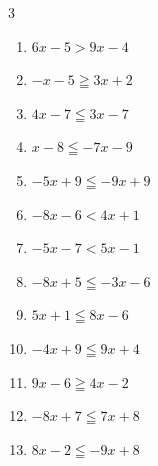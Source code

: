 \begin{multicols}{3}
\begin{enumerate}
  \item $6x-5>9x-4$


  \item $-x-5\geqq 3x+2$


  \item $4x-7\leqq 3x-7$

        \phantom{$\displaystyle x\leqq 0$}

  \item $x-8\leqq -7x-9$


  \item $-5x+9\leqq -9x+9$

        \phantom{$\displaystyle x\leqq 0$}

  \item $-8x-6<4x+1$


  \item $-5x-7<5x-1$


  \item $-8x+5\leqq -3x-6$


\columnbreak %

\resetques

  \item $5x+1\leqq 8x-6$


  \item $-4x+9\leqq 9x+4$


  \item $9x-6\geqq 4x-2$


  \item $-8x+7\leqq 7x+8$


  \item $8x-2\leqq -9x+8$



\end{enumerate}
\end{multicols}
